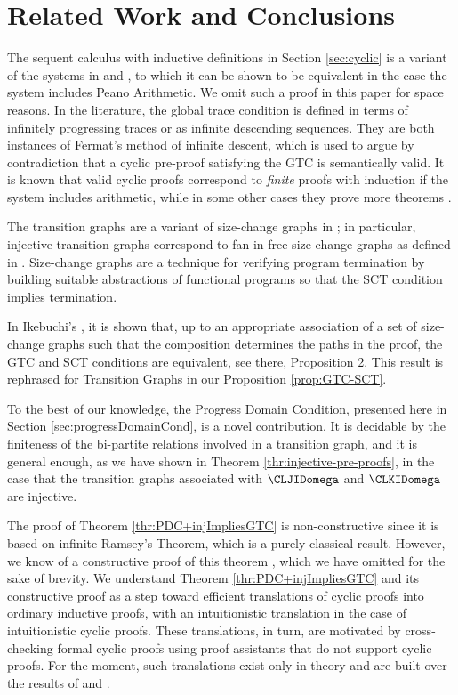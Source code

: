 \section{Related Work and Conclusions}
\label{sec:Related}

The sequent calculus with inductive definitions in Section \ref{sec:cyclic} is a variant of the systems in \cite{Brotherston1,Brotherston2} and \cite{BrotherstonSimpson}, to which it can be shown to be equivalent in the case the system includes Peano Arithmetic.
We omit such a proof in this paper for space reasons. %
In the literature, the global trace condition is defined in terms of infinitely progressing traces or as infinite descending sequences. They are both instances of Fermat's method of infinite descent, which is used to argue by contradiction that a cyclic pre-proof satisfying the GTC is semantically valid. It is known that valid cyclic proofs correspond to \emph{finite} proofs with induction if the system includes arithmetic, while in some other cases they prove more theorems \cite{Berardi}.

The transition graphs are a variant of size-change graphs in \cite{Lee1,Lee2,Lee3}; in particular, injective transition graphs correspond to fan-in free size-change graphs
as defined in \cite[\S 2.4]{Lee3}. Size-change graphs are a technique for verifying program termination by building suitable abstractions of functional programs so that the SCT condition implies termination. 

In Ikebuchi's \cite{Mirai}, it is shown that, up to an appropriate association of a set of size-change graphs such that the composition determines the paths in the proof, the GTC and SCT conditions are equivalent, see there, Proposition 2. This result is rephrased for Transition Graphs 
in our Proposition \ref{prop:GTC-SCT}. 

To the best of our knowledge, the Progress Domain Condition, presented here in Section 
\ref{sec:progressDomainCond}, is a novel contribution.
It is decidable by the finiteness of the bi-partite relations involved in a transition graph, and it is general enough, as we have shown in Theorem \ref{thr:injective-pre-proofs},
in the case that the transition graphs associated with %
$\CLJIDomega$ and $\CLKIDomega$ are injective.

The proof of Theorem \ref{thr:PDC+injImpliesGTC} is non-constructive since it is based on infinite Ramsey's Theorem, which is a purely classical result. However, we know
of a constructive proof of this theorem \cite{BERARDI20151382}, which we have omitted for the sake of brevity. We understand Theorem \ref{thr:PDC+injImpliesGTC} and its constructive proof as a step toward efficient translations of cyclic proofs into ordinary inductive proofs, with an intuitionistic
translation in the case of intuitionistic cyclic proofs. These translations, in turn, are motivated
by cross-checking formal cyclic proofs using proof assistants that do not support cyclic proofs.
For the moment, such translations exist only in theory and are built over the
results of \cite{Berardi} and \cite{Mirai}.

